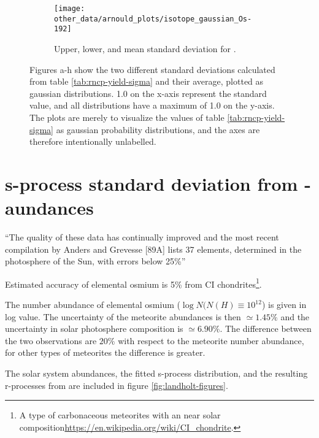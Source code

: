\begin{figure}
\begin{subfigure}{\subfiglength}
  \end{subfigure}
  \begin{subfigure}{\subfiglength}
    \centering
    \texttt{[image: other\_data/arnould\_plots/isotope\_gaussian\_Os-192]}
    \caption{Upper, lower, and mean standard deviation for .}
  \end{subfigure}
  \caption[Difference in upper and lower deviation from ]{\label{fig:arnould-gauss-dist}
    Figures a-h show the two different standard deviations calculated from table \ref{tab:rncp-yield-sigma} and their average, plotted as gaussian distributions.
    1.0 on the x-axis represent the standard value, and all distributions have a maximum of 1.0 on the y-axis.
    The plots are merely to visualize the values of table \ref{tab:rncp-yield-sigma} as gaussian probability distributions, and the axes are therefore intentionally unlabelled.
  }
\end{figure}
\FloatBarrier

\section{s-process standard deviation from \sos-aundances}
``The quality of these data has continually improved and the most recent compilation by
Anders and Grevesse [89A] lists 37 elements, determined in the photosphere of the Sun, with errors below
25\%''

Estimated accuracy of elemental osmium is 5\% from CI chondrites\footnote{A type of carbonaceous meteorites with an near solar composition\url{https://en.wikipedia.org/wiki/CI_chondrite}.}.

The number abundance of elemental osmium ($\log N(N(H)\equiv 10^{12}$) is given in log value. The uncertainty of the meteorite abundances is then $\simeq 1.45\%$ and the uncertainty in solar photosphere composition is $\simeq 6.90\%$. The difference between the two observations are $20\%$ with respect to the meteorite number abundance, for other types of meteorites the difference is greater.

The solar system abundances, the fitted s-process distribution, and the resulting r-processes from  are included in figure \ref{fig:landholt-figures}.

